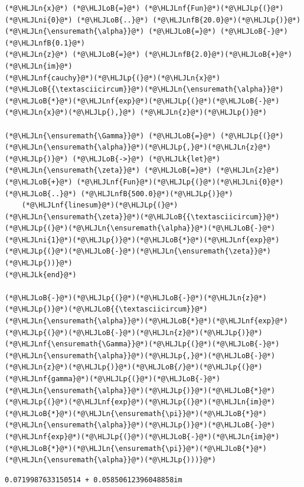 \documentclass[12pt,a4paper]{article}
\newcommand{\HLJLk}[1]{\textcolor[RGB]{148,91,176}{\textbf{#1}}}
\newcommand{\HLJLn}[1]{#1}
\newcommand{\HLJLnf}[1]{\textcolor[RGB]{66,102,213}{#1}}
\newcommand{\HLJLnfB}[1]{\textcolor[RGB]{59,151,46}{#1}}
\newcommand{\HLJLni}[1]{\textcolor[RGB]{59,151,46}{#1}}
\newcommand{\HLJLoB}[1]{\textcolor[RGB]{102,102,102}{\textbf{#1}}}
\newcommand{\HLJLp}[1]{#1}
\begin{document}
\begin{lstlisting}
(*@\HLJLn{x}@*) (*@\HLJLoB{=}@*) (*@\HLJLnf{Fun}@*)(*@\HLJLp{(}@*)(*@\HLJLni{0}@*) (*@\HLJLoB{..}@*) (*@\HLJLnfB{20.0}@*)(*@\HLJLp{)}@*)
(*@\HLJLn{\ensuremath{\alpha}}@*) (*@\HLJLoB{=}@*) (*@\HLJLoB{-}@*)(*@\HLJLnfB{0.1}@*)
(*@\HLJLn{z}@*) (*@\HLJLoB{=}@*) (*@\HLJLnfB{2.0}@*)(*@\HLJLoB{+}@*)(*@\HLJLn{im}@*)
(*@\HLJLnf{cauchy}@*)(*@\HLJLp{(}@*)(*@\HLJLn{x}@*)(*@\HLJLoB{{\textasciicircum}}@*)(*@\HLJLn{\ensuremath{\alpha}}@*)(*@\HLJLoB{*}@*)(*@\HLJLnf{exp}@*)(*@\HLJLp{(}@*)(*@\HLJLoB{-}@*)(*@\HLJLn{x}@*)(*@\HLJLp{),}@*) (*@\HLJLn{z}@*)(*@\HLJLp{)}@*)

(*@\HLJLn{\ensuremath{\Gamma}}@*) (*@\HLJLoB{=}@*) (*@\HLJLp{(}@*)(*@\HLJLn{\ensuremath{\alpha}}@*)(*@\HLJLp{,}@*)(*@\HLJLn{z}@*)(*@\HLJLp{)}@*) (*@\HLJLoB{->}@*) (*@\HLJLk{let}@*) (*@\HLJLn{\ensuremath{\zeta}}@*) (*@\HLJLoB{=}@*) (*@\HLJLn{z}@*) (*@\HLJLoB{+}@*) (*@\HLJLnf{Fun}@*)(*@\HLJLp{(}@*)(*@\HLJLni{0}@*) (*@\HLJLoB{..}@*) (*@\HLJLnfB{500.0}@*)(*@\HLJLp{)}@*)
    (*@\HLJLnf{linesum}@*)(*@\HLJLp{(}@*)(*@\HLJLn{\ensuremath{\zeta}}@*)(*@\HLJLoB{{\textasciicircum}}@*)(*@\HLJLp{(}@*)(*@\HLJLn{\ensuremath{\alpha}}@*)(*@\HLJLoB{-}@*)(*@\HLJLni{1}@*)(*@\HLJLp{)}@*)(*@\HLJLoB{*}@*)(*@\HLJLnf{exp}@*)(*@\HLJLp{(}@*)(*@\HLJLoB{-}@*)(*@\HLJLn{\ensuremath{\zeta}}@*)(*@\HLJLp{))}@*)
(*@\HLJLk{end}@*)

(*@\HLJLoB{-}@*)(*@\HLJLp{(}@*)(*@\HLJLoB{-}@*)(*@\HLJLn{z}@*)(*@\HLJLp{)}@*)(*@\HLJLoB{{\textasciicircum}}@*)(*@\HLJLn{\ensuremath{\alpha}}@*)(*@\HLJLoB{*}@*)(*@\HLJLnf{exp}@*)(*@\HLJLp{(}@*)(*@\HLJLoB{-}@*)(*@\HLJLn{z}@*)(*@\HLJLp{)}@*)(*@\HLJLnf{\ensuremath{\Gamma}}@*)(*@\HLJLp{(}@*)(*@\HLJLoB{-}@*)(*@\HLJLn{\ensuremath{\alpha}}@*)(*@\HLJLp{,}@*)(*@\HLJLoB{-}@*)(*@\HLJLn{z}@*)(*@\HLJLp{)}@*)(*@\HLJLoB{/}@*)(*@\HLJLp{(}@*)(*@\HLJLnf{gamma}@*)(*@\HLJLp{(}@*)(*@\HLJLoB{-}@*)(*@\HLJLn{\ensuremath{\alpha}}@*)(*@\HLJLp{)}@*)(*@\HLJLoB{*}@*)(*@\HLJLp{(}@*)(*@\HLJLnf{exp}@*)(*@\HLJLp{(}@*)(*@\HLJLn{im}@*)(*@\HLJLoB{*}@*)(*@\HLJLn{\ensuremath{\pi}}@*)(*@\HLJLoB{*}@*)(*@\HLJLn{\ensuremath{\alpha}}@*)(*@\HLJLp{)}@*)(*@\HLJLoB{-}@*)(*@\HLJLnf{exp}@*)(*@\HLJLp{(}@*)(*@\HLJLoB{-}@*)(*@\HLJLn{im}@*)(*@\HLJLoB{*}@*)(*@\HLJLn{\ensuremath{\pi}}@*)(*@\HLJLoB{*}@*)(*@\HLJLn{\ensuremath{\alpha}}@*)(*@\HLJLp{)))}@*)
\end{lstlisting}

\begin{lstlisting}
0.0719987633150514 + 0.05850612396048858im
\end{lstlisting}
\end{document}
